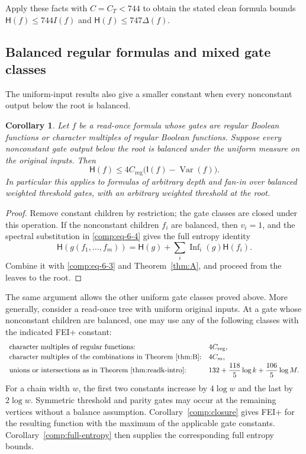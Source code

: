 \documentclass[11pt]{amsart}
\newtheorem{corollary}[theorem]{Corollary}
\theoremstyle{definition}
\theoremstyle{remark}
\newcommand{\HH}{\mathsf H}
\newcommand{\I}{\mathsf I}
\DeclareMathOperator{\Var}{Var}
\DeclareMathOperator{\Inf}{Inf}
\newcommand{\Creg}{C_{\mathrm{reg}}}
\newcommand{\Cmulti}{C_m}
\begin{document}
Apply these facts with \(C=C_T<744\) to obtain the stated clean formula bounds \(\HH(f)\le744I(f)\) and \(\HH(f)\le747\Delta(f)\).

\subsection{Balanced regular formulas and mixed gate classes}

The uniform-input results also give a smaller constant when every nonconstant output below the root is balanced.

\begin{corollary}\label{comp:balanced-regular}
Let $f$ be a read-once formula whose gates are regular Boolean functions or character multiples of regular Boolean functions. Suppose every nonconstant gate output below the root is balanced under the uniform measure on the original inputs. Then
\[
 \HH(f)\le4\Creg\bigl(\I(f)-\Var(f)\bigr).
\]
In particular this applies to formulas of arbitrary depth and fan-in over balanced weighted threshold gates, with an arbitrary weighted threshold at the root.
\end{corollary}
\begin{proof}
Remove constant children by restriction; the gate classes are closed under this operation. If the nonconstant children $f_i$ are balanced, then $v_i=1$, and the spectral substitution in \eqref{comp:eq-6-4} gives the full entropy identity
\[
 \HH(g(f_1,\ldots,f_m))
   =\HH(g)+\sum_i\Inf_i(g)\HH(f_i).
\]
Combine it with \eqref{comp:eq-6-3} and Theorem~\ref{thm:A}, and proceed from the leaves to the root.
\end{proof}

The same argument allows the other uniform gate classes proved above. More generally, consider a read-once tree with uniform original inputs. At a gate whose nonconstant children are balanced, one may use any of the following classes with the indicated FEI+ constant:
\[
\begin{array}{ll}
 \text{character multiples of regular functions:}
    &4\Creg,\\[2pt]
 \text{character multiples of the combinations in Theorem~\ref{thm:B}:}
    &4\Cmulti,\\[2pt]
 \text{unions or intersections as in Theorem~\ref{thm:readk-intro}:}
    &132+\dfrac{118}{5}\log k+\dfrac{106}{5}\log M.
\end{array}
\]
For a chain width $w$, the first two constants increase by $4\log w$ and the last by $2\log w$. Symmetric threshold and parity gates may occur at the remaining vertices without a balance assumption. Corollary~\ref{comp:closure} gives FEI+ for the resulting function with the maximum of the applicable gate constants. Corollary~\ref{comp:full-entropy} then supplies the corresponding full entropy bounds.
\end{document}
